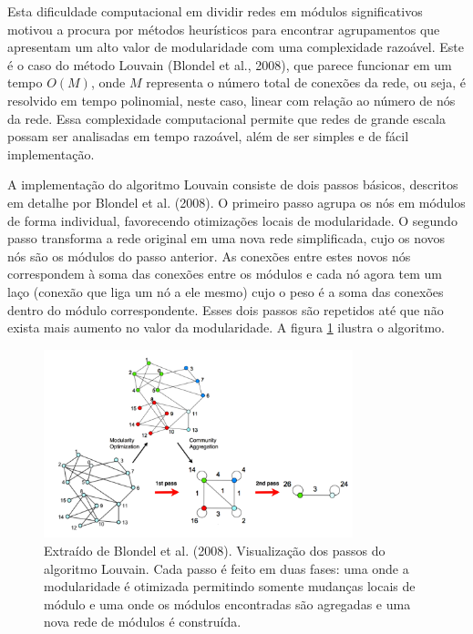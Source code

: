 \documentclass[
  12pt,
]{article}
\begin{document}
Esta dificuldade computacional em dividir redes em módulos
significativos motivou a procura por métodos heurísticos para encontrar
agrupamentos que apresentam um alto valor de modularidade com uma
complexidade razoável. Este é o caso do método Louvain (Blondel et al.,
2008), que parece funcionar em um tempo \(O(M)\), onde \(M\) representa
o número total de conexões da rede, ou seja, é resolvido em tempo
polinomial, neste caso, linear com relação ao número de nós da rede.
Essa complexidade computacional permite que redes de grande escala
possam ser analisadas em tempo razoável, além de ser simples e de fácil
implementação.

A implementação do algoritmo Louvain consiste de dois passos básicos,
descritos em detalhe por Blondel et al. (2008). O primeiro passo agrupa
os nós em módulos de forma individual, favorecendo otimizações locais de
modularidade. O segundo passo transforma a rede original em uma nova
rede simplificada, cujo os novos nós são os módulos do passo anterior.
As conexões entre estes novos nós correspondem à soma das conexões entre
os módulos e cada nó agora tem um laço (conexão que liga um nó a ele
mesmo) cujo o peso é a soma das conexões dentro do módulo
correspondente. Esses dois passos são repetidos até que não exista mais
aumento no valor da modularidade. A figura \ref{fig:algoritmo_Louvain}
ilustra o algoritmo.

\begin{figure}[H] 
\centering
\includegraphics[width=0.8\textwidth]{./Figuras/Algoritmo_Louvain.png}
\caption{Extraído de Blondel et al. (2008). Visualização dos passos do algoritmo Louvain. Cada passo é feito em duas fases: uma onde a modularidade é otimizada permitindo somente mudanças locais de módulo e uma onde os módulos encontradas são agregadas e uma nova rede de módulos é construída.}
\label{fig:algoritmo_Louvain}
\end{figure}
\end{document}
